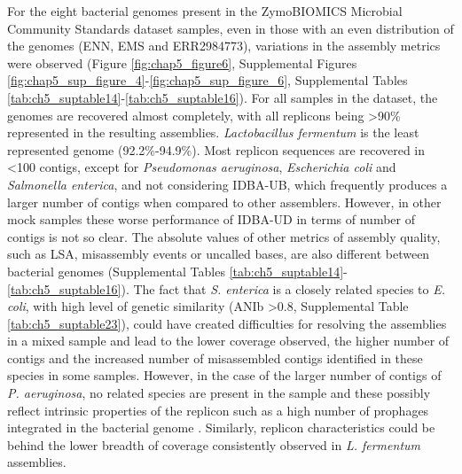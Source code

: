 For the eight bacterial genomes present in the ZymoBIOMICS Microbial Community Standards dataset samples, even in those with an even distribution of the genomes (ENN, EMS and ERR2984773), variations in the assembly metrics were observed (Figure \ref{fig:chap5_figure6}, Supplemental Figures \ref{fig:chap5_sup_figure_4}-\ref{fig:chap5_sup_figure_6}, Supplemental Tables \ref{tab:ch5_suptable14}-\ref{tab:ch5_suptable16}).  For all samples in the dataset, the genomes are recovered almost completely, with all replicons being >90\% represented in the resulting assemblies. \textit{Lactobacillus fermentum} is the least represented genome (92.2\%-94.9\%). Most replicon sequences are recovered in <100 contigs, except for \textit{Pseudomonas aeruginosa}, \textit{Escherichia coli} and \textit{Salmonella enterica}, and not considering IDBA-UB, which frequently produces a larger number of contigs when compared to other assemblers. However, in other mock samples these worse performance of IDBA-UD in terms of number of contigs is not so clear. The absolute values of other metrics of assembly quality, such as \ac{LSA}, misassembly events or uncalled bases, are also different between bacterial genomes (Supplemental Tables \ref{tab:ch5_suptable14}-\ref{tab:ch5_suptable16}). The fact that \textit{S. enterica} is a closely related species to \textit{E. coli}, with high level of genetic similarity (ANIb >0.8, Supplemental Table \ref{tab:ch5_suptable23}), could have created difficulties for resolving the assemblies in a mixed sample and lead to the lower coverage observed, the higher number of contigs and the increased number of misassembled contigs identified in these species in some samples. However, in the case of the larger number of contigs of \textit{P. aeruginosa}, no related species are present in the sample and these possibly reflect intrinsic properties of the replicon such as a high number of prophages integrated in the bacterial genome \cite{johnson_complete_2019}. Similarly, replicon characteristics could be behind the lower breadth of coverage consistently observed in \textit{L. fermentum} assemblies. 

